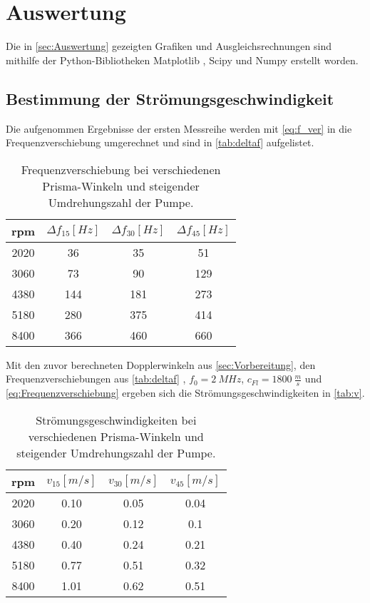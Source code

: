 \section{Auswertung}
\label{sec:Auswertung}
Die in \autoref{sec:Auswertung} gezeigten Grafiken und Ausgleichsrechnungen sind mithilfe der Python-Bibliotheken Matplotlib \cite{matplotlib}, Scipy \cite{scipy} und Numpy \cite{numpy}
erstellt worden.
\subsection{Bestimmung der Strömungsgeschwindigkeit}
Die aufgenommen Ergebnisse der ersten Messreihe werden mit \autoref{eq:f_ver} 
in die Frequenzverschiebung umgerechnet und sind in \autoref{tab:deltaf} aufgelistet.
\begin{table}[H]
    \centering
    \caption{Frequenzverschiebung bei verschiedenen Prisma-Winkeln und steigender Umdrehungszahl der Pumpe.}
    \begin{tabular}{c c c c}
        \toprule
        {rpm} & {$\Delta f_{15} [\unit{Hz}]$} & {$\Delta f_{30} [\unit{Hz}]$} & {$\Delta f_{45} [\unit{Hz}]$}\\
        \midrule
        2020 & 36 & 35 & 51 \\
        3060 & 73 & 90 & 129\\
        4380 & 144& 181& 273\\
        5180 & 280& 375& 414\\
        8400 & 366& 460& 660\\
        \bottomrule
    \end{tabular}
    \label{tab:deltaf}
\end{table}
Mit den zuvor berechneten Dopplerwinkeln aus \autoref{sec:Vorbereitung}, den Frequenzverschiebungen aus \autoref{tab:deltaf}
, $f_{0} = \SI{2}{MHz}$, $c_{Fl} = \SI{1800}{\frac{m}{s}}$ und \autoref{eq:Frequenzverschiebung} ergeben sich die
Strömungsgeschwindigkeiten in \autoref{tab:v}.
\begin{table}[H]
    \centering
    \caption{Strömungsgeschwindigkeiten bei verschiedenen Prisma-Winkeln und steigender Umdrehungszahl der Pumpe.}
    \begin{tabular}{c c c c}
        \toprule
        {rpm} & {$v_{15} [\unit{m/s}]$} & {$v_{30} [\unit{m/s}]$} & {$v_{45} [\unit{m/s}]$}\\
        \midrule
        2020 & 0.10 & 0.05 & 0.04 \\
        3060 & 0.20 & 0.12 & 0.1\\
        4380 & 0.40& 0.24& 0.21\\
        5180 & 0.77& 0.51& 0.32\\
        8400 & 1.01& 0.62& 0.51\\
        \bottomrule
    \end{tabular}
    \label{tab:v}
\end{table}
